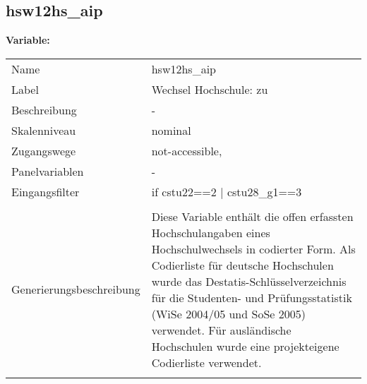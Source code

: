 	
	
	\subsection{hsw12hs\_aip}
	\label{subSection:hsw12hs_aip}

	\noindent\textbf{Variable:}\\
		\begin{tabular}{lL{11.3cm}}
			\label{tableVariable:hsw12hs_aip}
			Name & hsw12hs\_aip \\
			Label & Wechsel Hochschule: zu \\
			Beschreibung & - \\
			Skalenniveau & nominal \\
			Zugangswege &
				not-accessible,
 \\
			Panelvariablen & -
			 \\
			Eingangsfilter & if cstu22==2 | cstu28\_g1==3 \\
 \\
					Generierungsbeschreibung & Diese Variable enthält die offen erfassten Hochschulangaben eines Hochschulwechsels in codierter Form. Als Codierliste für deutsche Hochschulen wurde das Destatis-Schlüsselverzeichnis für die Studenten- und Prüfungsstatistik (WiSe 2004/05 und SoSe 2005) verwendet. Für ausländische Hochschulen wurde eine projekteigene Codierliste verwendet.
				 \\	
			 \\
		\end{tabular}






	
	\newpage
